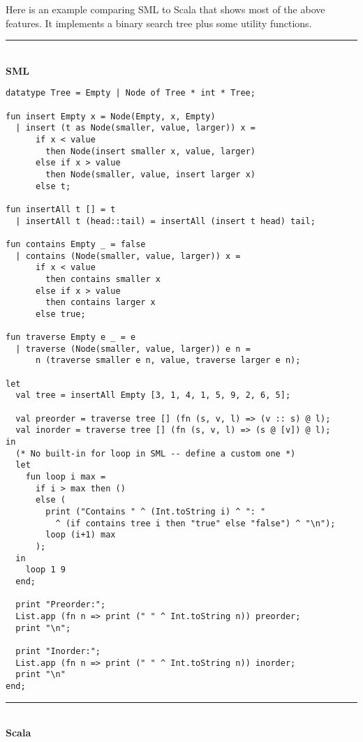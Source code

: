 \documentclass[11pt]{article}
\begin{document}
Here is an example comparing SML to Scala that shows most of the above features. It implements a binary search tree plus some utility functions.

\noindent\rule{\textwidth}{1pt}\\\textbf{SML}
\begin{verbatim}
datatype Tree = Empty | Node of Tree * int * Tree;

fun insert Empty x = Node(Empty, x, Empty)
  | insert (t as Node(smaller, value, larger)) x =
      if x < value
        then Node(insert smaller x, value, larger)
      else if x > value
        then Node(smaller, value, insert larger x)
      else t;
      
fun insertAll t [] = t
  | insertAll t (head::tail) = insertAll (insert t head) tail;

fun contains Empty _ = false
  | contains (Node(smaller, value, larger)) x =
      if x < value
        then contains smaller x
      else if x > value
        then contains larger x
      else true;

fun traverse Empty e _ = e
  | traverse (Node(smaller, value, larger)) e n =
      n (traverse smaller e n, value, traverse larger e n);
      
let
  val tree = insertAll Empty [3, 1, 4, 1, 5, 9, 2, 6, 5];

  val preorder = traverse tree [] (fn (s, v, l) => (v :: s) @ l);
  val inorder = traverse tree [] (fn (s, v, l) => (s @ [v]) @ l);
in
  (* No built-in for loop in SML -- define a custom one *)
  let
    fun loop i max =
      if i > max then ()
      else (
        print ("Contains " ^ (Int.toString i) ^ ": "
          ^ (if contains tree i then "true" else "false") ^ "\n");
        loop (i+1) max
      );
  in
    loop 1 9
  end;

  print "Preorder:";
  List.app (fn n => print (" " ^ Int.toString n)) preorder;
  print "\n";

  print "Inorder:";
  List.app (fn n => print (" " ^ Int.toString n)) inorder;
  print "\n"
end;
\end{verbatim}
\rule{\textwidth}{1pt}\\\textbf{Scala}
\end{document}
